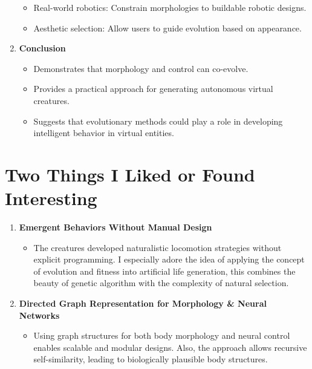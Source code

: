 \documentclass[12pt]{article}
\begin{document}
\begin{enumerate}[noitemsep]
\begin{itemize}[noitemsep]
        \item Real-world robotics: Constrain morphologies to buildable robotic designs.
        \item Aesthetic selection: Allow users to guide evolution based on appearance.
    \end{itemize}
    \item \textbf{Conclusion}
    \begin{itemize}[noitemsep]
        \item Demonstrates that morphology and control can co-evolve.
        \item Provides a practical approach for generating autonomous virtual creatures.
        \item Suggests that evolutionary methods could play a role in developing intelligent behavior in virtual entities.
    \end{itemize}
\end{enumerate}

\section{Two Things I Liked or Found Interesting}
\begin{enumerate}[noitemsep]
    \item \textbf{Emergent Behaviors Without Manual Design}
    \begin{itemize}[noitemsep]
        \item The creatures developed naturalistic locomotion strategies without explicit programming. I especially adore the idea of applying the concept of evolution and fitness into artificial life generation, this combines the beauty of genetic algorithm with the complexity of natural selection.
    \end{itemize}
    \item \textbf{Directed Graph Representation for Morphology \& Neural Networks}
    \begin{itemize}[noitemsep]
        \item Using graph structures for both body morphology and neural control enables scalable and modular designs. Also, the approach allows recursive self-similarity, leading to biologically plausible body structures.
    \end{itemize}
\end{enumerate}
\end{document}
